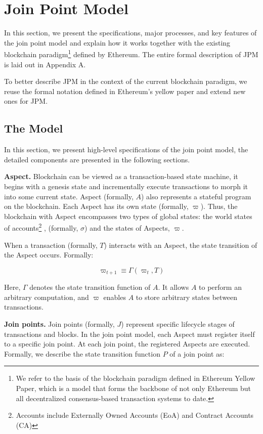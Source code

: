 \section{Join Point Model}

In this section, we present the specifications, major processes, and key features of the join point model and explain how it works together with the existing blockchain paradigm\footnote{We refer to the basis of the blockchain paradigm defined in Ethereum Yellow Paper, which is a model that forms the backbone of not only Ethereum but all decentralized consensus-based transaction systems to date.} defined by Ethereum. The entire formal description of JPM is laid out in Appendix A.

To better describe JPM in the context of the current blockchain paradigm, we reuse the formal notation defined in Ethereum's yellow paper\cite{wood2014ethereum} and extend new ones for JPM.

\subsection{The Model}

In this section, we present high-level specifications of the join point model, the detailed components are presented in the following sections.

\textbf{Aspect.} Blockchain can be viewed as a transaction-based state machine, it begins with a genesis state and incrementally execute transactions to morph it into some current state. Aspect (formally, $A$) also represents a stateful program on the blockchain. Each Aspect has its own state (formally, $\varpi$). Thus, the blockchain with Aspect encompasses two types of global states: the world states of accounts\footnote{Accounts include Externally Owned Accounts (EoA) and Contract Accounts (CA)} , (formally,  $\sigma$) and the states of Aspects, $\varpi$. 

When a transaction (formally, $T$) interacts with an Aspect, the state transition of the Aspect occurs. Formally: 

$$
\varpi_{t+1} \equiv \Gamma(\varpi_{t},T) 
$$

Here, $\Gamma$ denotes the state transition function of $A$. It allows $A$ to perform an arbitrary computation, and $\varpi$ enables $A$ to store arbitrary states between transactions. 

\textbf{Join points.} Join points (formally, $J$) represent specific lifecycle stages of transactions and blocks. In the join point model, each Aspect must register itself to a specific join point. At each join point, the registered Aspects are executed. Formally, we describe the state transition function $P$ of a join point as:

